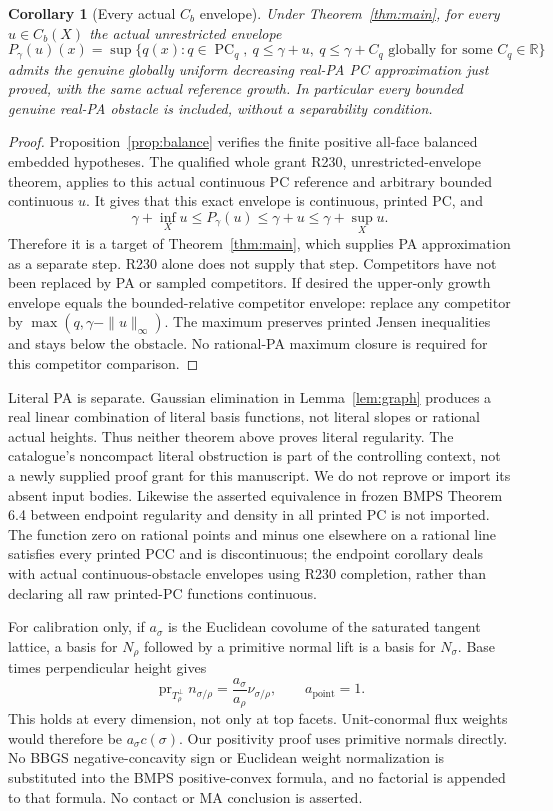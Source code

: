 \documentclass[11pt]{article}
\newtheorem{corollary}[theorem]{Corollary}
\newcommand{\R}{\mathbb R}
\newcommand{\PC}{\operatorname{PC}_q}
\begin{document}
\begin{corollary}[Every actual $C_b$ envelope]\label{cor:envelope}
Under Theorem~\ref{thm:main}, for every $u\in C_b(X)$ the actual unrestricted envelope
\[
P_\gamma(u)(x)=\sup\{q(x):q\in\PC,\ q\leq\gamma+u,
\ q\leq\gamma+C_q\text{ globally for some }C_q\in\R\}
\]
admits the genuine globally uniform decreasing real-PA PC approximation just proved, with the same actual reference growth. In particular every bounded genuine real-PA obstacle is included, without a separability condition.
\end{corollary}
\begin{proof}
Proposition~\ref{prop:balance} verifies the finite positive all-face balanced embedded hypotheses. The qualified whole grant R230, unrestricted-envelope theorem, applies to this actual continuous PC reference and arbitrary bounded continuous $u$. It gives that this exact envelope is continuous, printed PC, and
\[
\gamma+\inf_Xu\leq P_\gamma(u)\leq\gamma+u\leq\gamma+\sup_Xu.
\]
Therefore it is a target of Theorem~\ref{thm:main}, which supplies PA approximation as a separate step. R230 alone does not supply that step. Competitors have not been replaced by PA or sampled competitors. If desired the upper-only growth envelope equals the bounded-relative competitor envelope: replace any competitor by $\max(q,\gamma-\|u\|_\infty)$. The maximum preserves printed Jensen inequalities and stays below the obstacle. No rational-PA maximum closure is required for this competitor comparison.
\end{proof}

Literal PA is separate. Gaussian elimination in Lemma~\ref{lem:graph} produces a real linear combination of literal basis functions, not literal slopes or rational actual heights. Thus neither theorem above proves literal regularity. The catalogue's noncompact literal obstruction is part of the controlling context, not a newly supplied proof grant for this manuscript. We do not reprove or import its absent input bodies. Likewise the asserted equivalence in frozen BMPS Theorem 6.4 between endpoint regularity and density in all printed PC is not imported. The function zero on rational points and minus one elsewhere on a rational line satisfies every printed PCC and is discontinuous; the endpoint corollary deals with actual continuous-obstacle envelopes using R230 completion, rather than declaring all raw printed-PC functions continuous.

For calibration only, if $a_\sigma$ is the Euclidean covolume of the saturated tangent lattice, a basis for $N_\rho$ followed by a primitive normal lift is a basis for $N_\sigma$. Base times perpendicular height gives
\[
\operatorname{pr}_{T_\rho^\perp}n_{\sigma/\rho}
=\frac{a_\sigma}{a_\rho}\nu_{\sigma/\rho},\qquad a_{\text{point}}=1.
\]
This holds at every dimension, not only at top facets. Unit-conormal flux weights would therefore be $a_\sigma c(\sigma)$. Our positivity proof uses primitive normals directly. No BBGS negative-concavity sign or Euclidean weight normalization is substituted into the BMPS positive-convex formula, and no factorial is appended to that formula. No contact or MA conclusion is asserted.
\end{document}
